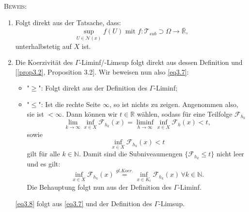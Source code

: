 \textsc{Beweis:}
\begin{enumerate}
    \item Folgt direkt aus der Tatsache, dass:
    \begin{equation}
        \sup_{U \in \mathcal{N}(x)} f(U) \text{ mit }f: \mathcal{T}_{sub} \supset \Omega \to \overline{\mathbb{R}},
    \end{equation}
    unterhalbstetig auf \(X\) ist.
    \item Die Koerzivität des \(\Gamma\)-Liminf/-Limsup folgt direkt aus dessen Definition und [\ref{prop3.2}, Proposition 3.2]. Wir beweisen nun also \eqref{eq3.7}:
    \begin{itemize}
        \item "\(\geq\)": Folgt direkt aus der Definition des \(\Gamma\)-Liminf;
        \item "\(\leq\)": Ist die rechte Seite \(\infty\), so ist nichts zu zeigen. Angenommen also, sie ist \(< \infty\). Dann können wir \(t \in \mathbb{R}\) wählen, sodass für eine Teilfolge \(\mathcal{F}_{h_k}\)
        \begin{equation}
            \lim_{k \to \infty} \inf_{x \in X} \mathcal{F}_{h_k}(x) = \liminf_{h \to \infty} \inf_{x \in X} \mathcal{F}_h(x) < t,
        \end{equation}
        sowie
        \begin{equation}
            \inf_{x \in X} \mathcal{F}_{h_k}(x) < t
        \end{equation}
        gilt für alle \(k \in \mathbb{N}\). Damit sind die Subniveaumengen \(\{\mathcal{F}_{h_k} \leq t\}\) nicht leer und es gilt:
        \begin{equation}
            \inf_{x \in X} \mathcal{F}_{h_k}(x) \stackrel{gl.Koer.}{=} \inf_{x \in K_t} \mathcal{F}_{h_k}(x) \, \forall k \in \mathbb{N}.
        \end{equation}
        Die Behauptung folgt nun aus der Definition des \(\Gamma\)-Liminf.
    \end{itemize}
    \eqref{eq3.8} folgt aus \eqref{eq3.7} und der Definition des \(\Gamma\)-Limsup. \QEDB
\end{enumerate}

